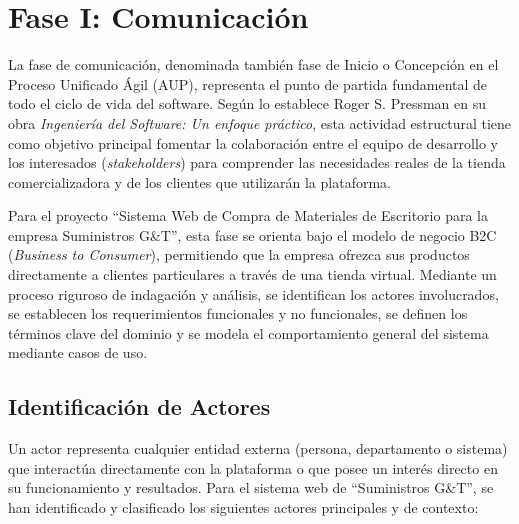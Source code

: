 \section{Fase I: Comunicación}

La fase de comunicación, denominada también fase de Inicio o Concepción en el Proceso Unificado Ágil (AUP), representa el punto de partida fundamental de todo el ciclo de vida del software. Según lo establece Roger S. Pressman en su obra \textit{Ingeniería del Software: Un enfoque práctico}, esta actividad estructural tiene como objetivo principal fomentar la colaboración entre el equipo de desarrollo y los interesados (\textit{stakeholders}) para comprender las necesidades reales de la tienda comercializadora y de los clientes que utilizarán la plataforma.

Para el proyecto ``Sistema Web de Compra de Materiales de Escritorio para la empresa Suministros G\&T'', esta fase se orienta bajo el modelo de negocio B2C (\textit{Business to Consumer}), permitiendo que la empresa ofrezca sus productos directamente a clientes particulares a través de una tienda virtual. Mediante un proceso riguroso de indagación y análisis, se identifican los actores involucrados, se establecen los requerimientos funcionales y no funcionales, se definen los términos clave del dominio y se modela el comportamiento general del sistema mediante casos de uso.

\subsection{Identificación de Actores}

Un actor representa cualquier entidad externa (persona, departamento o sistema) que interactúa directamente con la plataforma o que posee un interés directo en su funcionamiento y resultados. Para el sistema web de ``Suministros G\&T'', se han identificado y clasificado los siguientes actores principales y de contexto:


